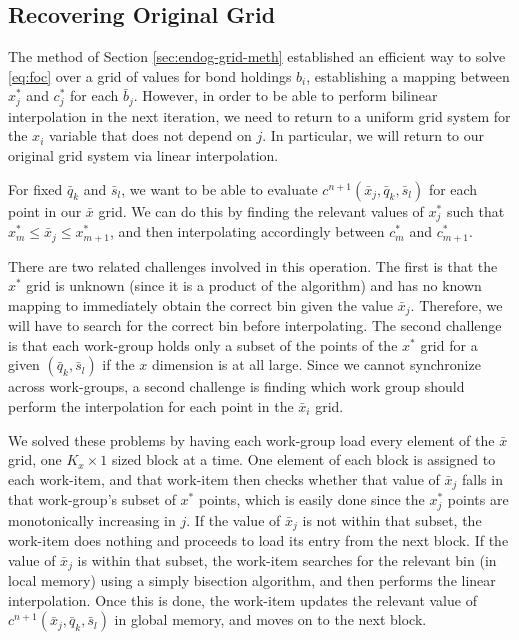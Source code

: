 \documentclass[a4paper,12pt]{article}
\numberwithin{equation}{section}
\theoremstyle{definition}
\begin{document}
\subsection{Recovering Original Grid}

The method of Section \ref{sec:endog-grid-meth} established an
efficient way to solve \eqref{eq:foc} over a grid of values for bond
holdings $b_i$, establishing a mapping between $x_j^*$ and $c_j^*$ for
each $\bar{b}_j$. However, in order to be able to perform bilinear
interpolation in the next iteration, we need to return to a uniform
grid system for the $x_i$ variable that does not depend on $j$. In
particular, we will return to our original grid system via linear
interpolation.

For fixed $\bar{q}_k$ and $\bar{s}_l$, we want to be able to evaluate
$c^{n+1}(\bar{x}_j, \bar{q}_k, \bar{s}_l)$ for each point in our
$\bar{x}$ grid. We can do this by finding the relevant values of
$x_j^*$ such that $x_m^* \le \bar{x}_j \le x_{m+1}^*$, and then
interpolating accordingly between $c_m^*$ and $c_{m+1}^*$.

There are two related challenges involved in this operation. The first
is that the $x^*$ grid is unknown (since it is a product of the
algorithm) and has no known mapping to immediately obtain the correct
bin given the value $\bar{x}_j$. Therefore, we will have to search for
the correct bin before interpolating. The second challenge is that
each work-group holds only a subset of the points of the $x^*$ grid
for a given $(\bar{q}_k, \bar{s}_l)$ if the $x$ dimension is at all
large. Since we cannot synchronize across work-groups, a second
challenge is finding which work group should perform the interpolation
for each point in the $\bar{x}_i$ grid.

We solved these problems by having each work-group load every element
of the $\bar{x}$ grid, one $K_x \times 1$ sized block at a time. One
element of each block is assigned to each work-item, and that
work-item then checks whether that value of $\bar{x}_j$ falls in that
work-group's subset of $x^*$ points, which is easily done since the
$x_j^*$ points are monotonically increasing in $j$. If the value of
$\bar{x}_j$ is not within that subset, the work-item does nothing and
proceeds to load its entry from the next block. If the value of
$\bar{x}_j$ is within that subset, the work-item searches for the
relevant bin (in local memory) using a simply bisection algorithm, and
then performs the linear interpolation. Once this is done, the
work-item updates the relevant value of $c^{n+1}(\bar{x}_j, \bar{q}_k,
\bar{s}_l)$ in global memory, and moves on to the next block.
\end{document}
